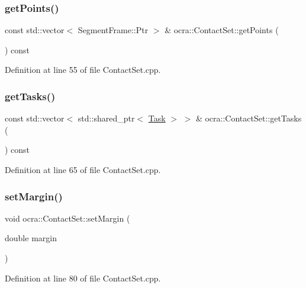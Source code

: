 \subsubsection{\texorpdfstring{get\+Points()}{getPoints()}}
{\footnotesize\ttfamily const std\+::vector$<$ Segment\+Frame\+::\+Ptr $>$ \& ocra\+::\+Contact\+Set\+::get\+Points (\begin{DoxyParamCaption}{ }\end{DoxyParamCaption}) const}



Definition at line 55 of file Contact\+Set.\+cpp.

\hypertarget{classocra_1_1ContactSet_a5f3b18a88fc7fd4f0de7b0bb87e40c77}{}\label{classocra_1_1ContactSet_a5f3b18a88fc7fd4f0de7b0bb87e40c77} 
\subsubsection{\texorpdfstring{get\+Tasks()}{getTasks()}}
{\footnotesize\ttfamily const std\+::vector$<$ std\+::shared\+\_\+ptr$<$ \hyperlink{classocra_1_1Task}{Task} $>$ $>$ \& ocra\+::\+Contact\+Set\+::get\+Tasks (\begin{DoxyParamCaption}{ }\end{DoxyParamCaption}) const}



Definition at line 65 of file Contact\+Set.\+cpp.

\hypertarget{classocra_1_1ContactSet_adb5aa2d4b3463d328d4687ca352b4c04}{}\label{classocra_1_1ContactSet_adb5aa2d4b3463d328d4687ca352b4c04} 
\subsubsection{\texorpdfstring{set\+Margin()}{setMargin()}}
{\footnotesize\ttfamily void ocra\+::\+Contact\+Set\+::set\+Margin (\begin{DoxyParamCaption}\item[{double}]{margin }\end{DoxyParamCaption})}



Definition at line 80 of file Contact\+Set.\+cpp.

\hypertarget{classocra_1_1ContactSet_a54d6c7d8c1266300f8a4f6d1be754630}{}\label{classocra_1_1ContactSet_a54d6c7d8c1266300f8a4f6d1be754630} 
